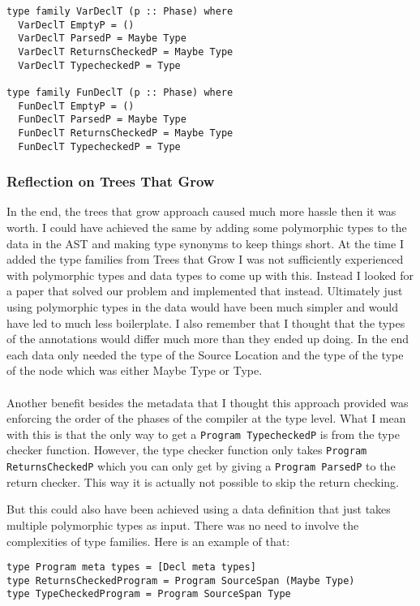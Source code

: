 \documentclass{report}
\begin{document}
\begin{verbatim}
type family VarDeclT (p :: Phase) where
  VarDeclT EmptyP = ()
  VarDeclT ParsedP = Maybe Type
  VarDeclT ReturnsCheckedP = Maybe Type
  VarDeclT TypecheckedP = Type

type family FunDeclT (p :: Phase) where
  FunDeclT EmptyP = ()
  FunDeclT ParsedP = Maybe Type
  FunDeclT ReturnsCheckedP = Maybe Type
  FunDeclT TypecheckedP = Type
\end{verbatim}

\subsubsection{Reflection on Trees That Grow} \label{sec:trees-that-grow-reflection}

In the end, the trees that grow approach caused much more hassle then it was worth. I could have achieved the same by adding some polymorphic types to the data in the AST and making type synonyms to keep things short. At the time I added the type families from Trees that Grow I was not sufficiently experienced with polymorphic types and data types to come up with this. Instead I looked for a paper that solved our problem and implemented that instead. Ultimately just using polymorphic types in the data would have been much simpler and would have led to much less boilerplate.
I also remember that I thought that the types of the annotations would differ much more than they ended up doing. In the end each data only needed the type of the Source Location and the type of the type of the node which was either Maybe Type or Type.
\\\\
Another benefit besides the metadata that I thought this approach provided was enforcing the order of the phases of the compiler at the type level. 
What I mean with this is that the only way to get a \texttt{Program TypecheckedP} is from the type checker function. However, the type checker function only takes \texttt{Program ReturnsCheckedP} which you can only get by giving a \texttt{Program ParsedP} to the return checker. This way it is actually not possible to skip the return checking. 

But this could also have been achieved using a data definition that just takes multiple polymorphic types as input. There was no need to involve the complexities of type families. Here is an example of that:
\begin{verbatim}
type Program meta types = [Decl meta types]
type ReturnsCheckedProgram = Program SourceSpan (Maybe Type)
type TypeCheckedProgram = Program SourceSpan Type
\end{verbatim}
\end{document}
